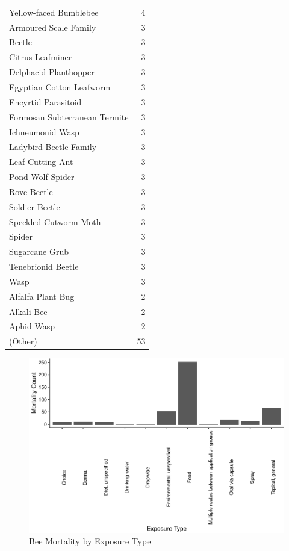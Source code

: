 \documentclass[
  12pt,
]{article}
\begin{document}
\begin{longtable}[]{@{}lr@{}}
Yellow-faced Bumblebee & 4 \\
Armoured Scale Family & 3 \\
Beetle & 3 \\
Citrus Leafminer & 3 \\
Delphacid Planthopper & 3 \\
Egyptian Cotton Leafworm & 3 \\
Encyrtid Parasitoid & 3 \\
Formosan Subterranean Termite & 3 \\
Ichneumonid Wasp & 3 \\
Ladybird Beetle Family & 3 \\
Leaf Cutting Ant & 3 \\
Pond Wolf Spider & 3 \\
Rove Beetle & 3 \\
Soldier Beetle & 3 \\
Speckled Cutworm Moth & 3 \\
Spider & 3 \\
Sugarcane Grub & 3 \\
Tenebrionid Beetle & 3 \\
Wasp & 3 \\
Alfalfa Plant Bug & 2 \\
Alkali Bee & 2 \\
Aphid Wasp & 2 \\
(Other) & 53 \\
\bottomrule
\end{longtable}

\begin{figure}
\centering
\includegraphics{Project_Template_files/figure-latex/unnamed-chunk-3-1.pdf}
\caption{Bee Mortality by Exposure Type}
\end{figure}
\end{document}
